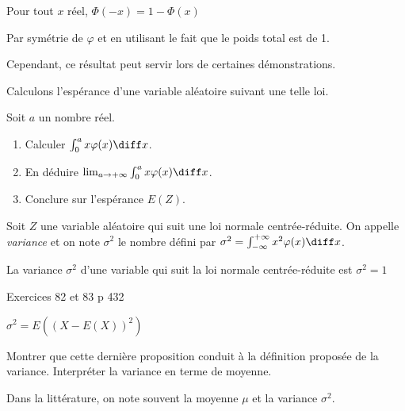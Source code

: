 \documentclass[11pt,a4paper,french]{article}
\begin{document}
\begin{propriete}
  Pour tout $x$ réel, $\Phi(-x) = 1 - \Phi(x)$
\end{propriete}
\begin{preuve}
  Par symétrie de $\varphi$ et en utilisant le fait que le poids total
  est de 1.
\end{preuve}

Cependant, ce résultat peut servir lors de certaines démonstrations.

Calculons l'espérance d'une variable aléatoire suivant une telle loi.

\begin{exercice}
  Soit $a$ un nombre réel.
  \begin{enumerate}
    \item Calculer $\int_0^a x\varphi(x) \diff x$.
    \item En déduire $\lim_{a\to+\infty} \int_0^a x\varphi(x) \diff x$.
    \item Conclure sur l'espérance $E(Z)$.
  \end{enumerate}
\end{exercice}

\begin{definition}[Variance]
  Soit $Z$ une variable aléatoire qui suit une loi normale
  centrée-réduite. On appelle \emph{variance} et on note $\sigma^2$ le
  nombre défini par $\sigma^2 = \int_{-\infty}^{+\infty} x^2\varphi(x)
  \diff x$.
\end{definition}

\begin{propriete}
  La variance $\sigma^2$ d'une variable qui suit la loi normale
  centrée-réduite est $\sigma^2 = 1$
\end{propriete}
\begin{preuve}
  Exercices 82 et 83 p 432
\end{preuve}

\begin{propriete}[admise]
  $\sigma^2 = E((X - E(X))^2)$
\end{propriete}

\begin{exercice}
  Montrer que cette dernière proposition conduit à la définition
  proposée de la variance. Interpréter la variance en terme de
  moyenne.
\end{exercice}

Dans la littérature, on note souvent la moyenne $\mu$ et la variance
$\sigma^2$.

\pagebreak
\end{document}
